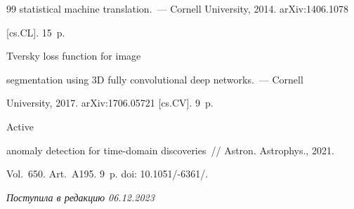 {{\begin{thebibliography}{99}
statistical machine translation.~--- Cornell University, 2014. arXiv:1406.1078 

[cs.CL]. 15~p.




  Tversky loss function for image 

segmentation using 3D fully convolutional deep networks.~--- Cornell 

University,  2017. arXiv:1706.05721 [cs.CV]. 9~p.




 Active 

anomaly detection for time-domain discoveries~/\!\!/ Astron. Astrophys., 2021. 

Vol.~650. Art.~A195. 9~p. doi: 10.1051\!/-6361\!/.





\label{end\stat}



\end{thebibliography}

} }





\hfill{\small\textit{Поступила в редакцию 06.12.2023}}


\renewcommand{\figurename}{\protect\bf Рис.}

